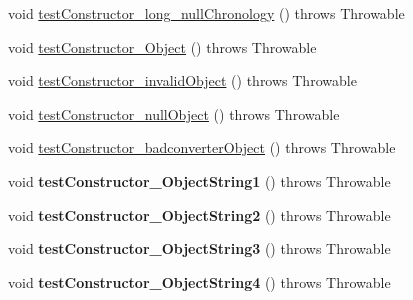 \begin{DoxyCompactItemize}
\item 
void \hyperlink{classorg_1_1joda_1_1time_1_1_test_date_time___constructors_a31264ec8ac954789697c110038b6a6f6}{test\-Constructor\-\_\-long\-\_\-null\-Chronology} ()  throws Throwable 
\item 
void \hyperlink{classorg_1_1joda_1_1time_1_1_test_date_time___constructors_ae44125333252700134eabb48e3dcee5e}{test\-Constructor\-\_\-\-Object} ()  throws Throwable 
\item 
void \hyperlink{classorg_1_1joda_1_1time_1_1_test_date_time___constructors_abe277e3b8babc14313c99dd44f57d097}{test\-Constructor\-\_\-invalid\-Object} ()  throws Throwable 
\item 
void \hyperlink{classorg_1_1joda_1_1time_1_1_test_date_time___constructors_a38ce8a46d03838f172d33c9f3353b30d}{test\-Constructor\-\_\-null\-Object} ()  throws Throwable 
\item 
void \hyperlink{classorg_1_1joda_1_1time_1_1_test_date_time___constructors_acc5a8b21ef714383c3c002be020eae98}{test\-Constructor\-\_\-badconverter\-Object} ()  throws Throwable 
\item 
\hypertarget{classorg_1_1joda_1_1time_1_1_test_date_time___constructors_a59c8a0dc85b17c679baab514122f8f20}{void {\bfseries test\-Constructor\-\_\-\-Object\-String1} ()  throws Throwable }\label{classorg_1_1joda_1_1time_1_1_test_date_time___constructors_a59c8a0dc85b17c679baab514122f8f20}

\item 
\hypertarget{classorg_1_1joda_1_1time_1_1_test_date_time___constructors_a913cf17f051c6bf28f4603edaa8e9933}{void {\bfseries test\-Constructor\-\_\-\-Object\-String2} ()  throws Throwable }\label{classorg_1_1joda_1_1time_1_1_test_date_time___constructors_a913cf17f051c6bf28f4603edaa8e9933}

\item 
\hypertarget{classorg_1_1joda_1_1time_1_1_test_date_time___constructors_ae9b60e0e4b7450986dbf9afe8403657f}{void {\bfseries test\-Constructor\-\_\-\-Object\-String3} ()  throws Throwable }\label{classorg_1_1joda_1_1time_1_1_test_date_time___constructors_ae9b60e0e4b7450986dbf9afe8403657f}

\item 
\hypertarget{classorg_1_1joda_1_1time_1_1_test_date_time___constructors_a36d097c6e23a5131717694a03b90c04d}{void {\bfseries test\-Constructor\-\_\-\-Object\-String4} ()  throws Throwable }\label{classorg_1_1joda_1_1time_1_1_test_date_time___constructors_a36d097c6e23a5131717694a03b90c04d}


\end{DoxyCompactItemize}
